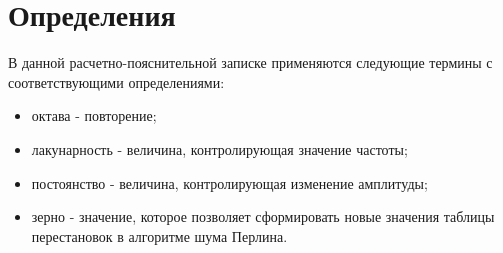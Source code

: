 \chapter*{Определения}
В данной расчетно-пояснительной записке применяются следующие термины с соответствующими определениями:
\begin{itemize}
	\item октава - повторение;
	\item лакунарность - величина, контролирующая значение частоты;
	\item постоянство - величина, контролирующая изменение амплитуды;
	\item зерно - значение, которое позволяет сформировать новые значения таблицы перестановок в алгоритме шума Перлина.
\end{itemize}